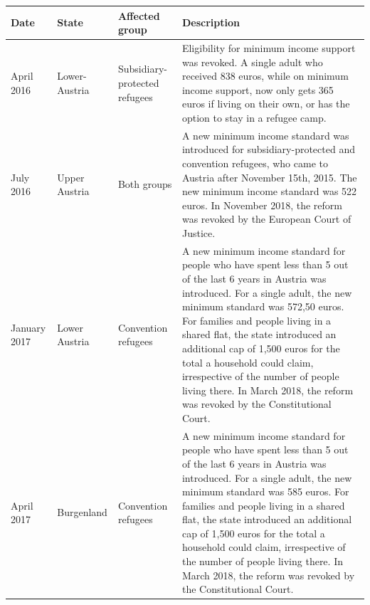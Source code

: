 \centering
\begin{tabular}{m{1cm}  m{1.5cm} m{2.2cm}  m{8cm} }
\hline
 \textbf{Date}           & \textbf{State} &   \textbf{Affected group} & \textbf{Description}   \\ \hline
 April 2016 & Lower-Austria & Subsidiary-protected refugees & Eligibility for minimum income support was revoked. A single
adult who received 838 euros, while on minimum income support, now only gets 365 euros if living on their own, or has the option to stay in a refugee camp. \\\hline
July 2016 & Upper Austria & Both groups & A new minimum income standard was introduced for subsidiary-protected and convention refugees, who came to Austria after November 15th, 2015. The new minimum income standard was 522 euros. In November 2018, the reform was revoked by the European Court of Justice. \\\hline
January 2017 & Lower Austria  & Convention refugees & A new minimum income standard for people who have spent less than 5 out of the last 6 years in Austria was introduced. For a single adult, the new minimum standard was 572,50 euros. For families and people living in a shared flat, the state introduced an additional cap of 1,500 euros for the total a household could claim, irrespective of the number of people living there. In March 2018, the reform was revoked by the Constitutional Court. \\\hline
April 2017  & Burgenland & Convention refugees & A new minimum income standard for people who have spent less than 5 out of the last 6 years in Austria was introduced. For a single adult, the new minimum standard was 585 euros. For families and people living in a shared flat, the state introduced an additional cap of 1,500 euros for the total a household could claim, irrespective of the number of people living there. In March 2018, the reform was revoked by the Constitutional Court. \\
 
\hline


\end{tabular}